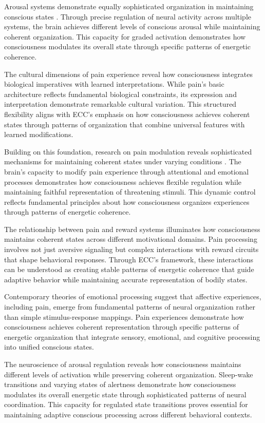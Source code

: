 Arousal systems demonstrate equally sophisticated organization in maintaining conscious states \cite{Pfaff2006}. Through precise regulation of neural activity across multiple systems, the brain achieves different levels of conscious arousal while maintaining coherent organization. This capacity for graded activation demonstrates how consciousness modulates its overall state through specific patterns of energetic coherence.

The cultural dimensions of pain experience \cite{Morris1991} reveal how consciousness integrates biological imperatives with learned interpretations. While pain's basic architecture reflects fundamental biological constraints, its expression and interpretation demonstrate remarkable cultural variation. This structured flexibility aligns with ECC's emphasis on how consciousness achieves coherent states through patterns of organization that combine universal features with learned modifications.

Building on this foundation, research on pain modulation reveals sophisticated mechanisms for maintaining coherent states under varying conditions \cite{Wiech2008}. The brain's capacity to modify pain experience through attentional and emotional processes demonstrates how consciousness achieves flexible regulation while maintaining faithful representation of threatening stimuli. This dynamic control reflects fundamental principles about how consciousness organizes experiences through patterns of energetic coherence.

The relationship between pain and reward systems \cite{Fields2007} illuminates how consciousness maintains coherent states across different motivational domains. Pain processing involves not just aversive signaling but complex interactions with reward circuits that shape behavioral responses. Through ECC's framework, these interactions can be understood as creating stable patterns of energetic coherence that guide adaptive behavior while maintaining accurate representation of bodily states.

Contemporary theories of emotional processing \cite{Barrett2009} suggest that affective experiences, including pain, emerge from fundamental patterns of neural organization rather than simple stimulus-response mappings. Pain experiences demonstrate how consciousness achieves coherent representation through specific patterns of energetic organization that integrate sensory, emotional, and cognitive processing into unified conscious states.

The neuroscience of arousal regulation \cite{Saper2010} reveals how consciousness maintains different levels of activation while preserving coherent organization. Sleep-wake transitions and varying states of alertness demonstrate how consciousness modulates its overall energetic state through sophisticated patterns of neural coordination. This capacity for regulated state transitions proves essential for maintaining adaptive conscious processing across different behavioral contexts.

